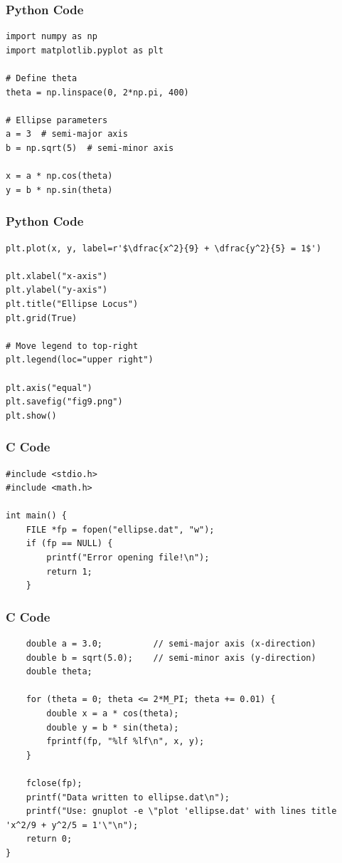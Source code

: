 \documentclass{beamer}
\begin{document}
\begin{frame}[fragile]
    \frametitle{Python Code}
    \begin{lstlisting}
import numpy as np
import matplotlib.pyplot as plt

# Define theta
theta = np.linspace(0, 2*np.pi, 400)

# Ellipse parameters
a = 3  # semi-major axis
b = np.sqrt(5)  # semi-minor axis

x = a * np.cos(theta)
y = b * np.sin(theta)
\end{lstlisting}
\end{frame}


\begin{frame}[fragile]
    \frametitle{Python Code}
    \begin{lstlisting}
plt.plot(x, y, label=r'$\dfrac{x^2}{9} + \dfrac{y^2}{5} = 1$')

plt.xlabel("x-axis")
plt.ylabel("y-axis")
plt.title("Ellipse Locus")
plt.grid(True)

# Move legend to top-right
plt.legend(loc="upper right")

plt.axis("equal") 
plt.savefig("fig9.png") 
plt.show()
\end{lstlisting}
\end{frame}

\begin{frame}[fragile]
    \frametitle{ C Code}
    \begin{lstlisting}
#include <stdio.h>
#include <math.h>

int main() {
    FILE *fp = fopen("ellipse.dat", "w");
    if (fp == NULL) {
        printf("Error opening file!\n");
        return 1;
    }
\end{lstlisting}
\end{frame}

\begin{frame}[fragile]
    \frametitle{ C Code}
    \begin{lstlisting}
    double a = 3.0;          // semi-major axis (x-direction)
    double b = sqrt(5.0);    // semi-minor axis (y-direction)
    double theta;

    for (theta = 0; theta <= 2*M_PI; theta += 0.01) {
        double x = a * cos(theta);
        double y = b * sin(theta);
        fprintf(fp, "%lf %lf\n", x, y);
    }

    fclose(fp);
    printf("Data written to ellipse.dat\n");
    printf("Use: gnuplot -e \"plot 'ellipse.dat' with lines title 'x^2/9 + y^2/5 = 1'\"\n");
    return 0;
}
\end{lstlisting}
\end{frame}
\end{document}
